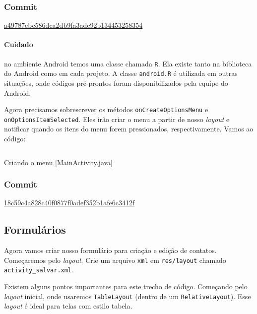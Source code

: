 \subsubsection{Commit}

\href{https://github.com/atilacamurca/guia-aberto-android-contatos/commit/a49787ebc586dca2db9fa3adc92b134453258354}{a49787ebc586dca2db9fa3adc92b134453258354}

\paragraph{Cuidado \label{par:r}}

no ambiente Android temos uma classe chamada \texttt{R}. Ela existe
tanto na biblioteca do Android como em cada projeto. A classe
\texttt{android.R} é utilizada em outras situações, onde códigos
pré-prontos foram disponibilizados pela equipe do Android.

Agora precisamos sobrescrever os métodos \texttt{onCreateOptionsMenu} e
\texttt{onOptionsItemSelected}. Eles irão criar o menu a partir de nosso
\emph{layout} e notificar quando os itens do menu forem pressionados,
respectivamente. Vamos ao código:

\begin{listing}[H]
  \inputminted[linenos=true,frame=bottomline,tabsize=3]{ java }{ source/MainActivity-2.java }
  \caption{Criando o menu [MainActivity.java]}
\end{listing}

\subsubsection{Commit}

\href{https://github.com/atilacamurca/guia-aberto-android-contatos/commit/18c59c4a828c40f0877f0adef352b1afe6c3412f}{18c59c4a828c40f0877f0adef352b1afe6c3412f}

\subsection{Formulários}

Agora vamos criar nosso formulário para criação e edição de contatos.
Começaremos pelo \emph{layout}. Crie um arquivo \texttt{xml} em
\texttt{res/layout} chamado \texttt{activity\_salvar.xml}.

Existem alguns pontos importantes para este trecho de código. Começando
pelo \emph{layout} inicial, onde usaremos \texttt{TableLayout} (dentro
de um \texttt{RelativeLayout}). Esse \emph{layout} é ideal para telas
com estilo tabela.

